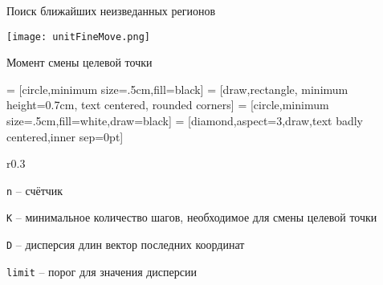 \begin{tslide}{Поиск ближайших неизведанных регионов}

    \vfill

    \begin{center}
    \texttt{[image: unitFineMove.png]}
    \end{center}

    \vfill

\end{tslide}

\begin{tslide}{Момент смены целевой точки}

     = [circle,minimum size=.5cm,fill=black]
     = [draw,rectangle, minimum height=0.7cm,
                text centered, rounded corners]
     = [circle,minimum size=.5cm,fill=white,draw=black]
     = [diamond,aspect=3,draw,text badly centered,inner sep=0pt]

    \begin{wrapfigure}{r}{0.3\linewidth}

    \end{wrapfigure}

    \verb|n| -- счётчик

    \verb|K| -- минимальное количество шагов, необходимое для смены целевой
                точки

    \verb|D| -- дисперсия длин вектор последних координат

    \verb|limit| -- порог для значения дисперсии

\end{tslide}

